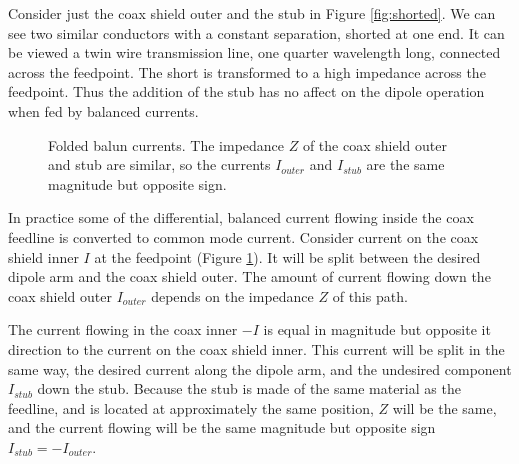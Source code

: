 \documentclass{article}
\begin{document}
Consider just the coax shield outer and the stub in Figure \ref{fig:shorted}.  We can see two similar conductors with a constant separation, shorted at one end.  It can be viewed a twin wire transmission line, one quarter wavelength long, connected across the feedpoint.  The short is transformed to a high impedance across the feedpoint. Thus the addition of the stub has no affect on the dipole operation when fed by balanced currents.

\begin{figure}[h]
\caption{Folded balun currents.  The impedance $Z$ of the coax shield outer and stub are similar, so the currents $I_{outer}$ and $I_{stub}$ are the same magnitude but opposite sign.}
\label{fig:currents}
\vspace{5mm}
\centering
{}
\end{figure}

In practice some of the differential, balanced current flowing inside the coax feedline is converted to common mode current.  Consider current on the coax shield inner $I$ at the feedpoint (Figure \ref{fig:currents}).  It will be split between the desired dipole arm and the coax shield outer. The amount of current flowing down the coax shield outer $I_{outer}$ depends on the impedance $Z$ of this path.

The current flowing in the coax inner $-I$ is equal in magnitude but opposite it direction to the current on the coax shield inner.  This current will be split in the same way, the desired current along the dipole arm, and the undesired component $I_{stub}$ down the stub.  Because the stub is made of the same material as the feedline, and is located at approximately the same position, $Z$ will be the same, and the current flowing will be the same magnitude but opposite sign $I_{stub}=-I_{outer}$.  
\end{document}
